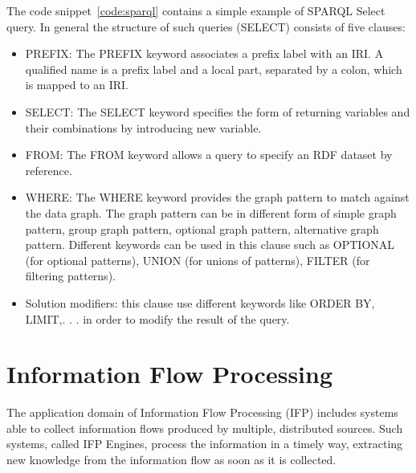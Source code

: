 The code snippet~\ref{code:sparql} contains a simple example of SPARQL Select query. In general the structure of such queries (SELECT) consists of five clauses:
\begin{itemize}
\item PREFIX: The PREFIX keyword associates a prefix label with an IRI. A qualified name is a prefix label and a local part, separated by a colon, which is mapped to an IRI.
\item SELECT: The SELECT keyword specifies the form of returning variables and their combinations by introducing new variable.
\item FROM: The FROM keyword allows a query to specify an RDF dataset by reference.
\item WHERE: The WHERE keyword provides the graph pattern to match against the data graph. The graph pattern can be in different form of simple graph pattern, group graph pattern, optional graph pattern, alternative graph pattern. Different keywords can be used in this clause such as OPTIONAL (for optional patterns), UNION (for unions of patterns), FILTER (for filtering patterns).
\item Solution modifiers: this clause use different keywords like ORDER BY, LIMIT,. . . in order to modify the result of the query.
\end{itemize}


\section{Information Flow Processing}\label{sec:ifp}

The application domain of Information Flow Processing (IFP) includes systems able to collect information flows produced by multiple, distributed sources. Such systems, called IFP Engines, process the information in a timely way, extracting new knowledge from the information flow as soon as it is collected.

